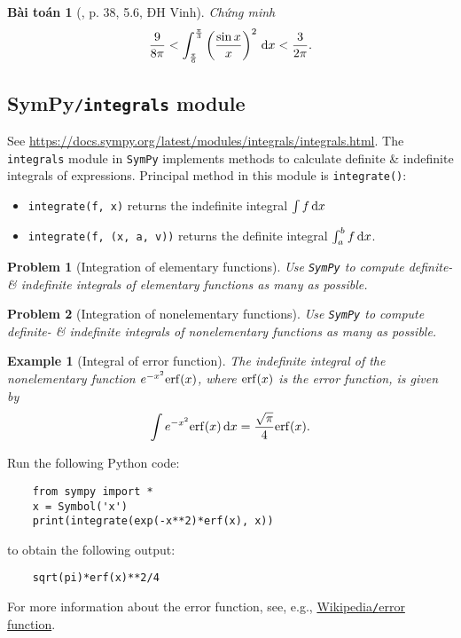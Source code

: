 \documentclass{article}
\newtheorem{baitoan}{Bài toán}
\newtheorem{example}{Example}
\newtheorem{problem}{Problem}
\begin{document}
\begin{baitoan}[\cite{VMS_VMC2024}, p. 38, 5.6, ĐH Vinh]
	Chứng minh
	\begin{equation*}
		\frac{9}{8\pi} < \int_{\frac{\pi}{6}}^{\frac{\pi}{3}} \left(\frac{\sin x}{x}\right)^2\,{\rm d}x < \frac{3}{2\pi}.
	\end{equation*}
\end{baitoan}


\subsection{SymPy{\tt/integrals} module}
See \url{https://docs.sympy.org/latest/modules/integrals/integrals.html}. The {\tt integrals} module in {\tt SymPy} implements methods to calculate definite \& indefinite integrals of expressions. Principal method in this module is {\tt integrate()}:
\begin{itemize}
	\item {\tt integrate(f, x)} returns the indefinite integral $\int f\,{\rm d}x$
	\item {\tt integrate(f, (x, a, v))} returns the definite integral $\int_a^b f\,{\rm d}x$.
\end{itemize}

\begin{problem}[Integration of elementary functions]
	Use {\tt SymPy} to compute definite- \& indefinite integrals of elementary functions as many as possible.
\end{problem}

\begin{problem}[Integration of nonelementary functions]
	Use {\tt SymPy} to compute definite- \& indefinite integrals of nonelementary functions as many as possible.
\end{problem}

\begin{example}[Integral of error function]
	The indefinite integral of the nonelementary function $e^{-x^2}{\rm erf}(x)$, where ${\rm erf}(x)$ is the {\rm error function}, is given by
	\begin{equation*}
		\int e^{-x^2}{\rm erf}(x)\,{\rm d}x = \frac{\sqrt{\pi}}{4}{\rm erf}(x).
	\end{equation*}
\end{example}
Run the following Python code:
\begin{verbatim}
	from sympy import *
	x = Symbol('x')
	print(integrate(exp(-x**2)*erf(x), x))
\end{verbatim}
to obtain the following output:
\begin{verbatim}
	sqrt(pi)*erf(x)**2/4
\end{verbatim}
For more information about the error function, see, e.g., \href{https://en.wikipedia.org/wiki/Error_function}{Wikipedia{\tt/}error function}.
\end{document}
